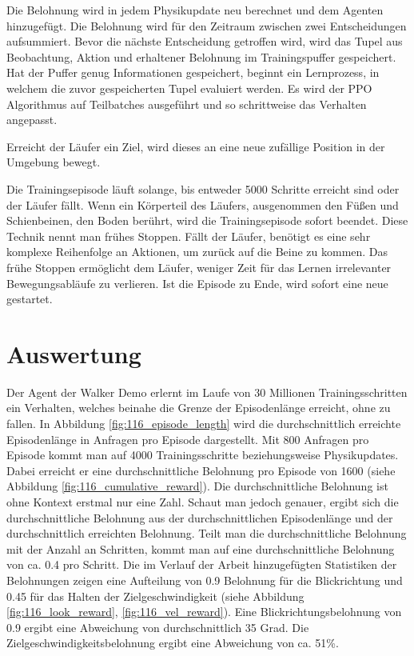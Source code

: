 Die Belohnung wird in jedem Physikupdate neu berechnet und dem Agenten hinzugefügt. Die Belohnung wird für den Zeitraum zwischen zwei Entscheidungen aufsummiert. Bevor die nächste Entscheidung getroffen wird, wird das Tupel aus Beobachtung, Aktion und erhaltener Belohnung im Trainingspuffer gespeichert. Hat der Puffer genug Informationen gespeichert, beginnt ein Lernprozess, in welchem die zuvor gespeicherten Tupel evaluiert werden. Es wird der PPO Algorithmus auf Teilbatches ausgeführt und so schrittweise das Verhalten angepasst.

Erreicht der Läufer ein Ziel, wird dieses an eine neue zufällige Position in der Umgebung bewegt.

Die Trainingsepisode läuft solange, bis entweder 5000 Schritte erreicht sind oder der Läufer fällt. Wenn ein Körperteil des Läufers, ausgenommen den Füßen und Schienbeinen, den Boden berührt, wird die Trainingsepisode sofort beendet. Diese Technik nennt man \grqq{}frühes Stoppen\grqq{}. Fällt der Läufer, benötigt es eine sehr komplexe Reihenfolge an Aktionen, um zurück auf die Beine zu kommen. Das frühe Stoppen ermöglicht dem Läufer, weniger Zeit für das Lernen irrelevanter Bewegungsabläufe zu verlieren. Ist die Episode zu Ende, wird sofort eine neue gestartet.

\section{Auswertung}
Der Agent der Walker Demo erlernt im Laufe von 30 Millionen Trainingsschritten ein Verhalten, welches beinahe die Grenze der Episodenlänge erreicht, ohne zu fallen. In Abbildung \ref{fig:116_episode_length} wird die durchschnittlich erreichte Episodenlänge in Anfragen pro Episode dargestellt. Mit 800 Anfragen pro Episode kommt man auf 4000 Trainingsschritte beziehungsweise Physikupdates. Dabei erreicht er eine durchschnittliche Belohnung pro Episode von 1600 (siehe Abbildung \ref{fig:116_cumulative_reward}). Die durchschnittliche Belohnung ist ohne Kontext erstmal nur eine Zahl. Schaut man jedoch genauer, ergibt sich die durchschnittliche Belohnung aus der durchschnittlichen Episodenlänge und der durchschnittlich erreichten Belohnung. Teilt man die durchschnittliche Belohnung mit der Anzahl an Schritten, kommt man auf eine durchschnittliche Belohnung von ca. 0.4 pro Schritt. Die im Verlauf der Arbeit hinzugefügten Statistiken der Belohnungen zeigen eine Aufteilung von 0.9 Belohnung für die Blickrichtung und 0.45 für das Halten der Zielgeschwindigkeit (siehe Abbildung \ref{fig:116_look_reward}, \ref{fig:116_vel_reward}). Eine Blickrichtungsbelohnung von 0.9 ergibt eine Abweichung von durchschnittlich 35 Grad. Die Zielgeschwindigkeitsbelohnung ergibt eine Abweichung von ca. 51\%.

